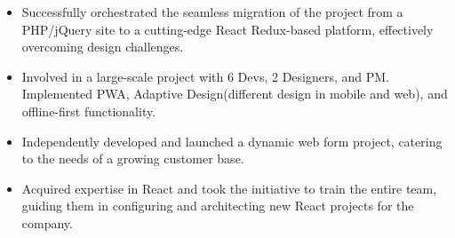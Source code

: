 \documentclass[10pt,a4paper,ragged2e,withhyper]{altacv}
\begin{document}
\begin{paracol}{2}
                \begin{itemize}
                \item Successfully orchestrated the seamless migration of the project from a PHP/jQuery site to a cutting-edge React Redux-based platform, effectively overcoming design challenges.
\item Involved in a large-scale project with 6 Devs, 2 Designers, and PM. Implemented PWA, Adaptive Design(different design in mobile and web), and offline-first functionality.
\end{itemize}

\divider


\begin{itemize}
\item Independently developed and launched a dynamic web form project, catering to the needs of a growing customer base.
\item Acquired expertise in React and took the initiative to train the entire team, guiding them in configuring and architecting new React projects for the company.
\end{itemize}


\newpage








\switchcolumn







\end{paracol}
\end{document}
